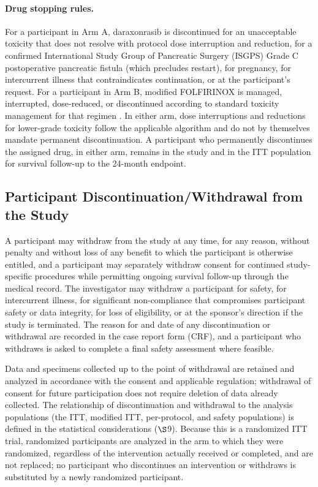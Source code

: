 \paragraph{Drug stopping rules.}
For a participant in Arm A, daraxonrasib is discontinued for an unacceptable
toxicity that does not resolve with protocol dose interruption and reduction, for a
confirmed International Study Group of Pancreatic Surgery (ISGPS) Grade C
postoperative pancreatic fistula \cite{Bassi2017} (which precludes restart), for
pregnancy, for intercurrent illness that contraindicates continuation, or at the
participant's request. For a participant in Arm B, modified FOLFIRINOX is managed,
interrupted, dose-reduced, or discontinued according to standard toxicity
management for that regimen \cite{Conroy2018}. In either arm, dose interruptions and
reductions for lower-grade toxicity follow the applicable algorithm and do not by
themselves mandate permanent discontinuation. A participant who permanently
discontinues the assigned drug, in either arm, remains in the study and in the ITT
population for survival follow-up to the 24-month endpoint.

\subsection{Participant Discontinuation/Withdrawal from the Study}

A participant may withdraw from the study at any time, for any reason, without
penalty and without loss of any benefit to which the participant is otherwise
entitled, and a participant may separately withdraw consent for continued
study-specific procedures while permitting ongoing survival follow-up through the
medical record. The investigator may withdraw a participant for safety, for
intercurrent illness, for significant non-compliance that compromises participant
safety or data integrity, for loss of eligibility, or at the sponsor's direction if
the study is terminated. The reason for and date of any discontinuation or
withdrawal are recorded in the case report form (CRF), and a participant who
withdraws is asked to complete a final safety assessment where feasible.

Data and specimens collected up to the point of withdrawal are retained and analyzed
in accordance with the consent and applicable regulation; withdrawal of consent for
future participation does not require deletion of data already collected. The
relationship of discontinuation and withdrawal to the analysis populations (the
ITT, modified ITT, per-protocol, and safety populations) is defined in the
statistical considerations ($\S$9). Because this is a randomized ITT trial,
randomized participants are analyzed in the arm to which they were randomized,
regardless of the intervention actually received or completed, and are not replaced;
no participant who discontinues an intervention or withdraws is substituted by a
newly randomized participant.

